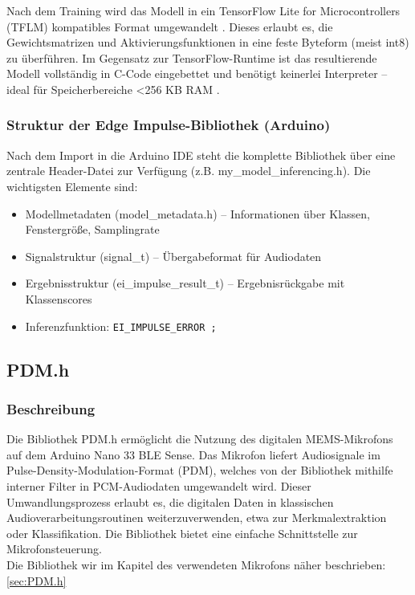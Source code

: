 Nach dem Training wird das Modell in ein TensorFlow Lite for Microcontrollers (TFLM) kompatibles Format umgewandelt \cite{TensorFlow:2025LiteMicrocontrollers}. Dieses erlaubt es, die Gewichtsmatrizen und Aktivierungsfunktionen in eine feste Byteform (meist int8) zu überführen. Im Gegensatz zur TensorFlow-Runtime ist das resultierende Modell vollständig in C-Code eingebettet und benötigt keinerlei Interpreter – ideal für Speicherbereiche <256 KB RAM \cite{TensorFlow:2025LiteMicrocontrollers}.\\

\subsubsection{Struktur der Edge Impulse-Bibliothek (Arduino)}

Nach dem Import in die Arduino IDE steht die komplette Bibliothek über eine zentrale Header-Datei zur Verfügung (z.B. my\_model\_inferencing.h). Die wichtigsten Elemente sind:

\begin{itemize}
    \item Modellmetadaten (model\_metadata.h) – Informationen über Klassen, Fenstergröße, Samplingrate
    
    \item Signalstruktur (signal\_t) – Übergabeformat für Audiodaten
    
    \item Ergebnisstruktur (ei\_impulse\_result\_t) – Ergebnisrückgabe mit Klassenscores
    
    \item Inferenzfunktion: \texttt{EI\_IMPULSE\_ERROR ;}
\end{itemize}



\subsection{PDM.h}

\subsubsection{Beschreibung} \label{sec.PDM.h_2}

Die Bibliothek PDM.h ermöglicht die Nutzung des digitalen MEMS-Mikrofons auf dem Arduino Nano 33 BLE Sense. Das Mikrofon liefert Audiosignale im Pulse-Density-Modulation-Format (PDM), welches von der Bibliothek mithilfe interner Filter in PCM-Audiodaten umgewandelt wird. Dieser Umwandlungsprozess erlaubt es, die digitalen Daten in klassischen Audioverarbeitungsroutinen weiterzuverwenden, etwa zur Merkmalextraktion oder Klassifikation. Die Bibliothek bietet eine einfache Schnittstelle zur Mikrofonsteuerung.\\
\bigskip
Die Bibliothek wir im Kapitel des verwendeten Mikrofons näher beschrieben: \ref{sec:PDM.h}


